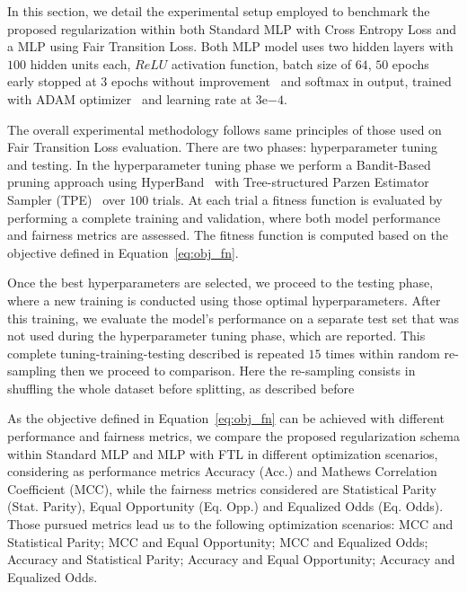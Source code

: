 In this section, we detail the experimental setup employed to benchmark the proposed regularization within both Standard MLP with Cross Entropy Loss and a MLP using Fair Transition Loss. Both MLP model uses two hidden layers with $100$ hidden units each, $ReLU$ activation function, batch size of $64$, $50$ epochs early stopped at $3$ epochs without improvement~\citep{Li2020} and softmax in output, trained with ADAM optimizer~\citep{KingmaB14} and learning rate at $3\mathrm{e}{-4}$. 

The overall experimental methodology follows same principles of those used on Fair Transition Loss evaluation. There are two phases: hyperparameter tuning and testing. In the hyperparameter tuning phase we perform a Bandit-Based pruning approach using HyperBand~\citep{Li2018} with Tree-structured Parzen Estimator Sampler (TPE)~\citep{bergstra2011} over $100$ trials. At each trial a fitness function is evaluated by performing a complete training and validation, where both model performance and fairness metrics are assessed. The fitness function is computed based on the objective defined in Equation~\ref{eq:obj_fn}. 

Once the best hyperparameters are selected, we proceed to the testing phase, where a new training is conducted using those optimal hyperparameters. After this training, we evaluate the model's performance on a separate test set that was not used during the hyperparameter tuning phase, which are reported. This complete tuning-training-testing described is repeated $15$ times within random re-sampling then we proceed to comparison. Here the re-sampling consists in shuffling the whole dataset before splitting, as described before

As the objective defined in Equation~\ref{eq:obj_fn} can be achieved with different performance and fairness metrics, we compare the proposed regularization schema within Standard MLP and MLP with FTL in different optimization scenarios, considering as performance metrics Accuracy (Acc.) and Mathews Correlation Coefficient (MCC), while the fairness metrics considered are Statistical Parity (Stat. Parity), Equal Opportunity (Eq. Opp.) and Equalized Odds (Eq. Odds). Those pursued metrics lead us to the following optimization scenarios: MCC and Statistical Parity; MCC and Equal Opportunity; MCC and Equalized Odds; Accuracy and Statistical Parity; Accuracy and Equal Opportunity; Accuracy and Equalized Odds.

